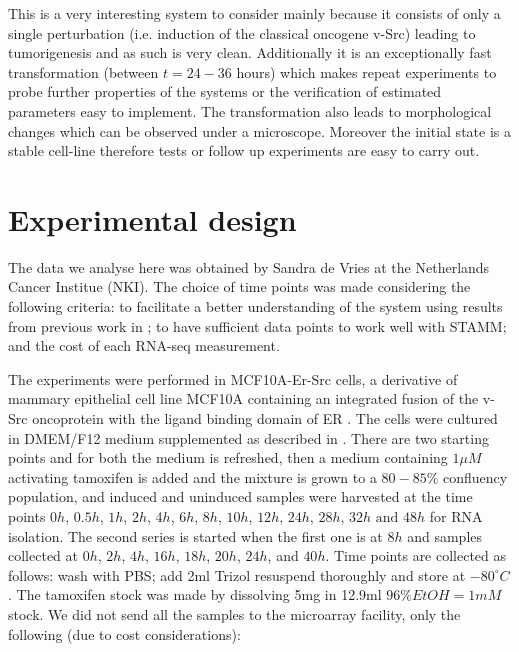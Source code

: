 This is a very interesting system to consider mainly because it consists of only a single perturbation (i.e. induction of the classical oncogene v-Src) leading to tumorigenesis and as such is very clean. Additionally it is an exceptionally fast transformation (between $t=24-36$ hours) which makes repeat experiments to probe further properties of the systems or the verification of estimated parameters easy to implement. The transformation also leads to morphological changes which can be observed under a microscope. Moreover the initial state is a stable cell-line therefore tests or follow up experiments are easy to carry out.

\section{Experimental design}
\label{sec:experimental-design}

The data we analyse here was obtained by Sandra de Vries at the Netherlands Cancer Institue (NKI). The choice of time points was made considering the following criteria: to facilitate a better understanding of the system using results from previous work in \cite{Hirsch:2010ec}; to have sufficient data points to work well with STAMM; and the cost of each RNA-seq measurement.

The experiments were performed in MCF10A-Er-Src cells, a derivative of mammary epithelial cell line MCF10A containing an integrated fusion of the v-Src oncoprotein with the ligand binding domain of ER \citep{Hirsch:2010ec,Iliopoulos:2009do}. The cells were cultured in DMEM/F12 medium supplemented as described in \cite{Debnath:2003km}. There are two starting points and for both the medium is refreshed, then a medium containing $1 \mu M$ activating tamoxifen is added and the mixture is grown to a $80 - 85\%$ confluency population, and induced and uninduced samples were harvested at the time points $ 0h$, $ 0.5h$, $ 1h$, $ 2h$, $ 4h$, $ 6h$, $ 8h$, $ 10h$, $ 12h$, $ 24h$, $ 28h$, $ 32h \text{ and } 48h$ for RNA isolation. The second series is started when the first one is at $8h$ and samples collected at $0h$, $2h$, $4h$, $16h$, $18h$, $20h$, $24h$, and $40h$. Time points are collected as follows: wash with PBS; add 2ml Trizol resuspend thoroughly and store at $-80^{\circ}C$. The tamoxifen stock was made by dissolving 5mg in 12.9ml $96\% EtOH = 1mM$ stock. We did not send all the samples to the microarray facility, only the following (due to cost considerations):

